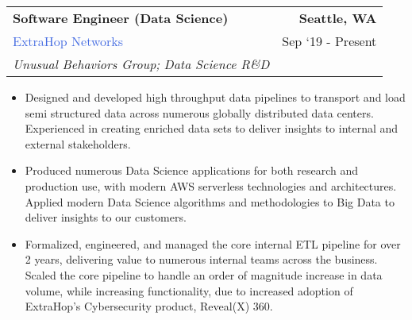 \documentclass[10pt]{article}
\newcommand{\highlightcolor}{RoyalBlue}
\newcommand{\tabularxwidth}{\textwidth}
\begin{document}
    
    \begin{minipage}{\tabularxwidth}

        \begin{tabularx}{\tabularxwidth}{X r}
            \textbf{Software Engineer (Data Science)} & \textbf{Seattle, 
        WA} \\
            
    
    
    

    
        \textcolor{\highlightcolor}{ExtraHop Networks} & 
        
    Sep ‘19 - Present \\
        
            \textit{Unusual Behaviors Group;}
                \textit{Data Science R\&D} & \\
        
    
            
        \end{tabularx}

        \begin{itemize}[noitemsep, topsep=3pt, parsep=0pt, partopsep=0pt]
            
                \item 
    Designed and developed high throughput data pipelines to transport and load semi structured data across numerous globally distributed data centers. Experienced in creating enriched data sets to deliver insights to internal and external stakeholders.
            
                \item 
    Produced numerous Data Science applications for both research and production use, with modern AWS serverless technologies and architectures. Applied modern Data Science algorithms and methodologies to Big Data to deliver insights to our customers.
            
                \item 
    Formalized, engineered, and managed the core internal ETL pipeline for over 2 years, delivering value to numerous internal teams across the business. Scaled the core pipeline to handle an order of magnitude increase in data volume, while increasing functionality, due to increased adoption of ExtraHop's Cybersecurity product, Reveal(X) 360.
            

\end{itemize}
\end{minipage}
\end{document}
